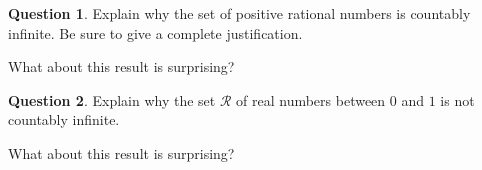 \documentclass[12pt,letterpaper]{article}
\theoremstyle{definition}
\newtheorem{question}{Question}
\begin{document}
\vspace{.5in}

\begin{question}
Explain why the set of positive rational numbers is countably infinite.
Be sure to give a complete justification.

What about this result is surprising?
\end{question}

\vspace{.5in}

\begin{question}
Explain why the set $\mathcal{R}$ of real numbers between $0$ and $1$ is not countably infinite.

What about this result is surprising?
\end{question}

\clearpage
\end{document}

